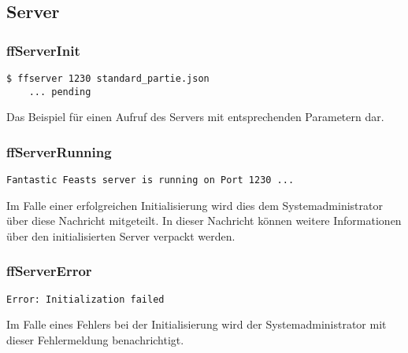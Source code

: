 \subsection{Server}
	\subsubsection{ffServerInit}
	\lstset{language=bash} 
	\begin{lstlisting}[frame=single]
  	$ ffserver 1230 standard_partie.json
  	... pending
	\end{lstlisting}
	Das Beispiel für einen Aufruf des Servers mit entsprechenden Parametern dar.
	
	\subsubsection{ffServerRunning}
	\lstset{language=bash} 
	\begin{lstlisting}[frame=single]
  	Fantastic Feasts server is running on Port 1230 ...
	\end{lstlisting}
	Im Falle einer erfolgreichen Initialisierung wird dies dem Systemadministrator über diese Nachricht mitgeteilt. In dieser Nachricht können weitere Informationen über den initialisierten Server verpackt werden.
	
	\subsubsection{ffServerError}
	\lstset{language=bash} 
	\begin{lstlisting}[frame=single]
  	Error: Initialization failed
	\end{lstlisting}
	Im Falle eines Fehlers bei der Initialisierung wird der Systemadministrator mit dieser Fehlermeldung benachrichtigt.


